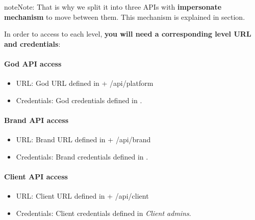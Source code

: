 \documentclass[letterpaper,10pt,english]{sphinxmanual}
\begin{document}
\begin{notice}{note}{Note:}
That is why we split it into three APIs with \textbf{impersonate mechanism} to move between them. This mechanism is
explained in {\hyperref[api_rest/use_case:use\string-case]{}} section.
\end{notice}

In order to access to each level, \textbf{you will need a corresponding level URL and credentials}:
\paragraph{God API access}
\begin{itemize}
\item {} 
URL: God URL defined in {\hyperref[administration_portal/platform/portals:platform\string-portals]{}} + /api/platform

\item {} 
Credentials: God credentials defined in {\hyperref[administration_portal/platform/main_operators:main\string-operators]{}}.

\end{itemize}
\paragraph{Brand API access}
\begin{itemize}
\item {} 
URL: Brand URL defined in {\hyperref[administration_portal/platform/brands:brand\string-portals]{}} + /api/brand

\item {} 
Credentials: Brand credentials defined in {\hyperref[administration_portal/platform/brands:brand\string-operators]{}}.

\end{itemize}
\paragraph{Client API access}
\begin{itemize}
\item {} 
URL: Client URL defined in {\hyperref[administration_portal/brand/settings/client_portals:client\string-portals]{}} + /api/client

\item {} 
Credentials: Client credentials defined in {\hyperref[administration_portal/brand/clients/wholesale:additional\string-subsections]{}} \emph{Client admins}.

\end{itemize}
\end{document}
